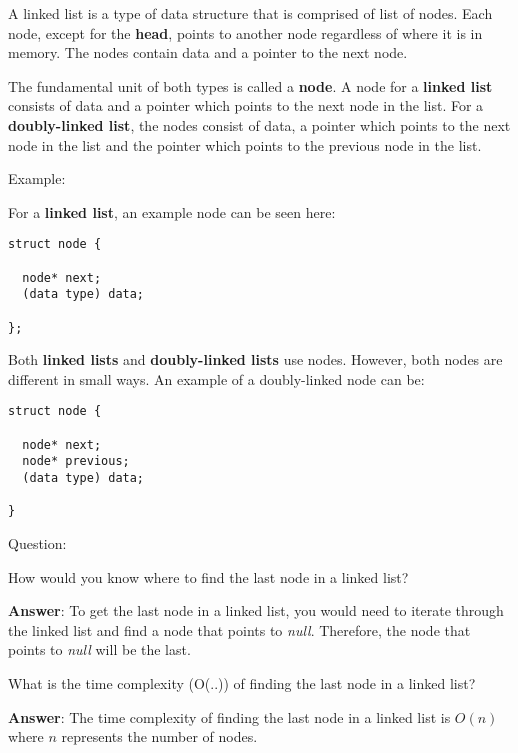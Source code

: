 \documentclass[11pt,a4paper,english]{paper}
\begin{document}
A linked list is a type of data structure that is comprised of list of nodes. Each node, except for the \textbf{head}, points to another node regardless of where it is in memory. The nodes contain data and a pointer to the next node.

\bigskip


\noindent The fundamental unit of both types is called a \textbf{node}. A node for a \textbf{linked list} consists of data and a pointer which points to the next node in the list. For a \textbf{doubly-linked list}, the nodes consist of data, a pointer which points to the next node in the list and the pointer which points to the previous node in the list.

\bigskip

\begin{bluebox}{Example:} {

    For a \textbf{linked list}, an example node can be seen here:

\begin{verbatim}
struct node {

  node* next;
  (data type) data;

};
\end{verbatim}

\bigskip

    Both \textbf{linked lists} and \textbf{doubly-linked lists} use nodes. However, both nodes are different in small ways. An example of a doubly-linked node can be:

\begin{verbatim}
struct node {

  node* next;
  node* previous;
  (data type) data;

}
\end{verbatim}
}
\end{bluebox}

\bigskip

\begin{gbox}{Question:} {

    How would you know where to find the last node in a linked list?

    \bigskip
    \textbf{Answer}: To get the last node in a linked list, you would need to iterate through the linked list and find a node that points to \textit{null}. Therefore, the node that points to \textit{null} will be the last.

    \bigskip
    What is the time complexity (O(..)) of finding the last node in a linked list?

    \bigskip
    \textbf{Answer}: The time complexity of finding the last node in a linked list is $O(n)$ where $n$ represents the number of nodes.


} \end{gbox}
\end{document}
